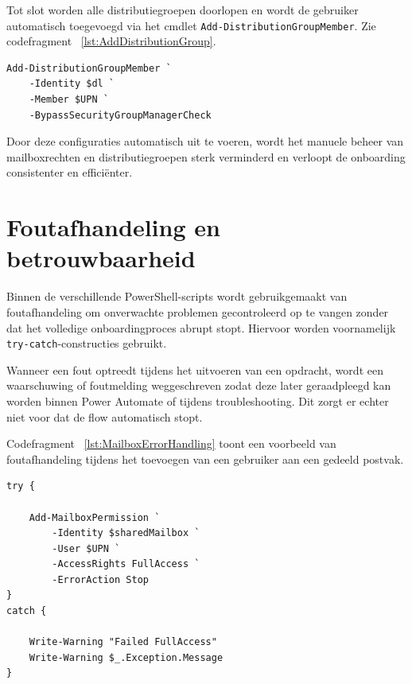 Tot slot worden alle distributiegroepen doorlopen en wordt de gebruiker automatisch toegevoegd via het cmdlet \texttt{Add-DistributionGroupMember}. Zie codefragment ~\ref{lst:AddDistributionGroup}.

\begin{listing}[ht]
\begin{verbatim}
Add-DistributionGroupMember `
    -Identity $dl `
    -Member $UPN `
    -BypassSecurityGroupManagerCheck
\end{verbatim}
\caption{Toevoegen aan distributiegroepen}
\label{lst:AddDistributionGroup}
\end{listing}

Door deze configuraties automatisch uit te voeren, wordt het manuele beheer van mailboxrechten en distributiegroepen sterk verminderd en verloopt de onboarding consistenter en efficiënter.

\section{Foutafhandeling en betrouwbaarheid}

Binnen de verschillende PowerShell-scripts wordt gebruikgemaakt van foutafhandeling om onverwachte problemen gecontroleerd op te vangen zonder dat het volledige onboardingproces abrupt stopt. Hiervoor worden voornamelijk \texttt{try-catch}-constructies gebruikt.

Wanneer een fout optreedt tijdens het uitvoeren van een opdracht, wordt een waarschuwing of foutmelding weggeschreven zodat deze later geraadpleegd kan worden binnen Power Automate of tijdens troubleshooting. Dit zorgt er echter niet voor dat de flow automatisch stopt.

Codefragment ~\ref{lst:MailboxErrorHandling} toont een voorbeeld van foutafhandeling tijdens het toevoegen van een gebruiker aan een gedeeld postvak.

\begin{listing}[ht]
\begin{verbatim}
try {

    Add-MailboxPermission `
        -Identity $sharedMailbox `
        -User $UPN `
        -AccessRights FullAccess `
        -ErrorAction Stop
}
catch {

    Write-Warning "Failed FullAccess"
    Write-Warning $_.Exception.Message
}
\end{verbatim}
\caption{Foutafhandeling bij mailboxrechten}
\label{lst:MailboxErrorHandling}
\end{listing}

